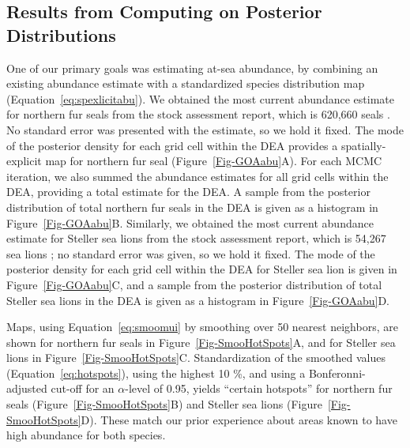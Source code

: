 \documentclass[11pt, titlepage]{article}
\begin{document}
\begin{spacing}{1.9}
\begin{flushleft}
\subsection{Results from Computing on Posterior Distributions}

One of our primary goals was estimating at-sea abundance, by combining an existing abundance estimate with a standardized species distribution map (Equation~\ref{eq:spexlicitabu}).  We obtained the most current abundance estimate for northern fur seals from the stock assessment report, which is 620,660 seals \citep{muto_alaska_2019}.  No standard error was presented with the estimate, so we hold it fixed. The mode of the posterior density for each grid cell within the DEA provides a spatially-explicit map for northern fur seal (Figure~\ref{Fig-GOAabu}A). For each MCMC iteration, we also summed the abundance estimates for all grid cells within the DEA, providing a total estimate for the DEA. A sample from the posterior distribution of total northern fur seals in the DEA is given as a histogram in Figure~\ref{Fig-GOAabu}B.  Similarly, we obtained the most current abundance estimate for Steller sea lions from the stock assessment report, which is 54,267 sea lions \citep{muto_alaska_2019}; no standard error was given, so we hold it fixed. The mode of the posterior density for each grid cell within the DEA for Steller sea lion is given in Figure~\ref{Fig-GOAabu}C, and a sample from the posterior distribution of total Steller sea lions in the DEA is given as a histogram in Figure~\ref{Fig-GOAabu}D.

Maps, using Equation~\eqref{eq:smoomui} by smoothing over 50 nearest neighbors, are shown for northern fur seals in Figure~\ref{Fig-SmooHotSpots}A, and for Steller sea lions in Figure~\ref{Fig-SmooHotSpots}C.  Standardization of the smoothed values (Equation~\ref{eq:hotspots}), using the highest 10 \%, and using a Bonferonni-adjusted cut-off for an $\alpha$-level of 0.95, yields ``certain hotspots'' for northern fur seals (Figure~\ref{Fig-SmooHotSpots}B) and Steller sea lions (Figure~\ref{Fig-SmooHotSpots}D).  These match our prior experience about areas known to have high abundance for both species.



\end{flushleft}
\end{spacing}
\end{document}
